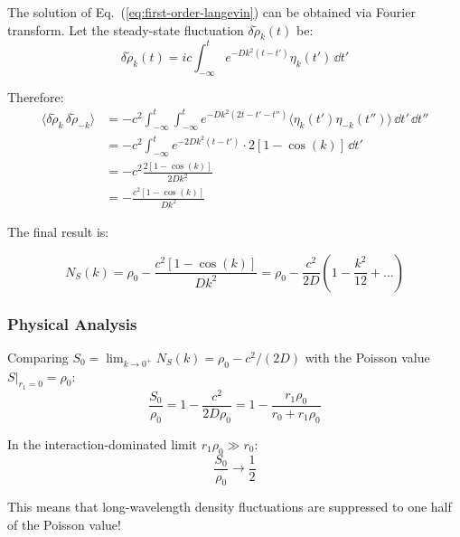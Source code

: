 \begin{derivation}
The solution of Eq.~(\ref{eq:first-order-langevin}) can be obtained via Fourier transform. Let the steady-state fluctuation $\delta\tilde{\rho}_k(t)$ be:
\[
\delta\tilde{\rho}_k(t) = ic \int_{-\infty}^{t} e^{-Dk^2(t-t')}\eta_k(t')\,\dd t'
\]

Therefore:
\begin{align}
\langle \delta\tilde{\rho}_k \, \delta\tilde{\rho}_{-k} \rangle &= -c^2 \int_{-\infty}^{t}\int_{-\infty}^{t} e^{-Dk^2(2t - t' - t'')} \langle \eta_k(t')\eta_{-k}(t'') \rangle \, \dd t' \, \dd t'' \nonumber\\
&= -c^2 \int_{-\infty}^{t} e^{-2Dk^2(t-t')} \cdot 2[1 - \cos(k)] \, \dd t' \nonumber\\
&= -c^2 \frac{2[1 - \cos(k)]}{2Dk^2} \nonumber\\
&= -\frac{c^2[1 - \cos(k)]}{Dk^2}\nonumber
\end{align}
\end{derivation}

The final result is:
\begin{resultbox}
\begin{equation}\label{eq:structure-factor-final}
\boxed{N_S(k) = \rho_0 - \frac{c^2[1 - \cos(k)]}{Dk^2} = \rho_0 - \frac{c^2}{2D}\left(1 - \frac{k^2}{12} + \ldots\right)}
\end{equation}
\end{resultbox}

\subsubsection{Physical Analysis}

Comparing $S_0 = \lim_{k\to 0^+} N_S(k) = \rho_0 - c^2/(2D)$ with the Poisson value $S|_{r_1=0} = \rho_0$:
\begin{equation}\label{eq:reduction-ratio}
\frac{S_0}{\rho_0} = 1 - \frac{c^2}{2D\rho_0} = 1 - \frac{r_1\rho_0}{r_0 + r_1\rho_0}
\end{equation}

In the interaction-dominated limit $r_1\rho_0 \gg r_0$:
\begin{equation}\label{eq:limit-result}
\boxed{\frac{S_0}{\rho_0} \to \frac{1}{2}}
\end{equation}

This means that long-wavelength density fluctuations are suppressed to one half of the Poisson value!

